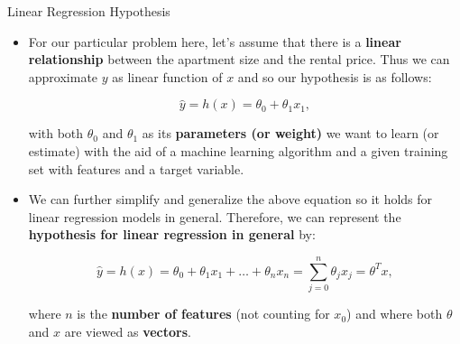 \documentclass[main.tex]{subfiles}
\begin{document}
    \begin{frame}{Linear Regression Hypothesis}
        \begin{itemize}
            \item For our particular problem here, let's assume that there is a \textbf{linear relationship} between the apartment size and the rental price. Thus we can approximate $y$ as linear function of $x$ and so our hypothesis is as follows:
            
            $$\hat y = h(x) = \theta_0 + \theta_1x_1,$$
            
            with both $\theta_0$ and $\theta_1$ as its \textbf{parameters (or weight)} we want to learn (or estimate) with the aid of a machine learning algorithm and a given training set with features and a target variable.
            \item We can further simplify and generalize the above equation so it holds for linear regression models in general. Therefore, we can represent the \textbf{hypothesis for linear regression in general} by:
            
            $$\hat y = h(x) = \theta_0 + \theta_1x_1 + \dots + \theta_nx_n = \sum_{j=0}^n \theta_jx_j = \theta^Tx,$$
            
            where $n$ is the \textbf{number of features} (not counting for $x_0$) and where both $\theta$ and $x$ are viewed as \textbf{vectors}.
        \end{itemize}
    \end{frame}
\end{document}
